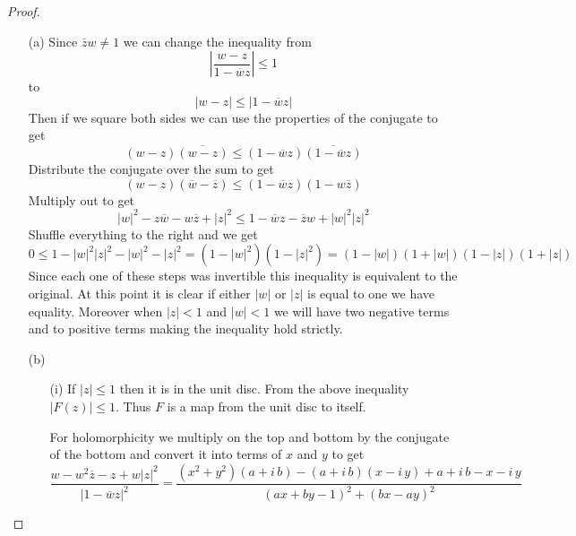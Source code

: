 \documentclass[10pt]{article}
\newcommand{\conj}[1]{\overline{#1}}
\theoremstyle{plain}
\theoremstyle{remark}
\begin{document}
\begin{proof}
  \begin{itemize}
  \item[(a)] Since $\conj{z}w\neq 1$ we can change the inequality from
    \[
      \left|
        \frac{w-z}{1-\conj{w}{z}}
      \right| \leq 1
    \]
    to
    \[
      |w-z|\leq |1-\conj{w}z|
    \]
    Then if we square both sides we can use the properties of the conjugate
    to get
    \[
      (w-z)\conj{(w-z)} \leq (1-\conj{w}z)\conj{(1-\conj{w}z)}
    \]
    Distribute the conjugate over the sum to get
    \[
      (w-z)(\conj{w}-\conj{z})\leq (1-\conj{w}z)(1-w\conj{z})
    \]
    Multiply out to get
    \[
      |w|^2-z\conj{w}-w\conj{z} + |z|^2\leq 1-\conj{w}z-\conj{z}w+|w|^2|z|^2
    \]
    Shuffle everything to the right and we get
    \[
      0 \leq 1-|w|^2|z|^2 -|w|^2-|z|^2 = (1-|w|^2)(1-|z|^2) = (1-|w|)(1+|w|)(1-|z|)(1+|z|)
    \]
    Since each one of these steps was invertible this inequality is equivalent
    to the original. At this point it is clear if either $|w|$ or $|z|$ is
    equal to one we have equality. Moreover when $|z|<1$ and $|w|<1$ we will
    have two negative terms and to positive terms making the inequality hold
    strictly.
  \item[(b)]
    \begin{itemize}
    \item[(i)] If $|z|\leq 1$ then  it is in the unit disc. From the above
      inequality $|F(z)|\leq 1$. Thus $F$ is a map from the unit disc to
      itself.

      For holomorphicity we multiply on the top and bottom by the conjugate of the bottom and
      convert it into terms of $x$ and $y$ to get
      \[
        \frac{w-w^2\conj{z}-z+w|z|^2}{|1-\conj{w}z|^2}=\frac{{\left(x^{2} + y^{2}\right)} {\left(a + i \, b\right)} - {\left(a + i \, b\right)} {\left(x - i \, y\right)} + a + i \, b - x - i \, y}{{\left(a x + b y - 1\right)}^{2} + {\left(b x - a y\right)}^{2}}
      \]


\end{itemize}
\end{itemize}
\end{proof}
\end{document}
